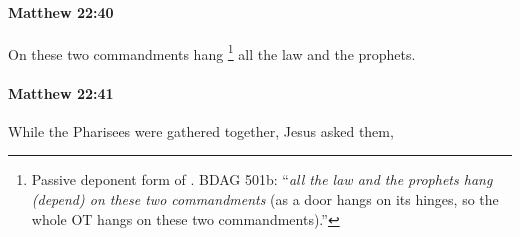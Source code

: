 		\paragraph{Matthew 22:40} %
			\label{MATTHEW-22-40}

			On these two commandments hang%
				\footnote{%
					Passive deponent form of . BDAG 501b: ``\textit{all the law and the prophets hang (depend) on these two commandments} (as a door hangs on its hinges, so the whole OT hangs on these two commandments).''
					}
			all the law and the prophets.

			\begin{framed}
			\scriptsize
				\begin{compactdesc}
					\item[SBLG] 
				\end{compactdesc}
			\end{framed}

		\paragraph{Matthew 22:41} %
			\label{MATTHEW-22-41}

			While the Pharisees were gathered together, Jesus asked them,

